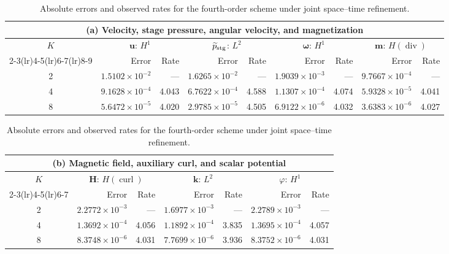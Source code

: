 \documentclass[11pt,a4paper]{article}
\newcommand{\bs}{\boldsymbol}
\DeclareMathOperator{\curl}{curl}
\DeclareMathOperator{\ddiv}{div}
\newcommand{\Div}{\ddiv}
\newcommand{\pp}{\widetilde p}
\theoremstyle{definition}
\numberwithin{equation}{section}
\begin{document}
\begin{table}[H]
\centering
\caption{Absolute errors and observed rates for the fourth-order scheme under joint space--time refinement.}
\label{tab:fourth-order-absolute-errors}
\begingroup
\small
\setlength{\tabcolsep}{3.5pt}
\renewcommand{\arraystretch}{1.10}
\begin{tabular}{@{}c*{8}{r}@{}}
\toprule
\multicolumn{9}{c}{(a) Velocity, stage pressure, angular velocity, and magnetization}\\
\midrule
$K$ & \multicolumn{2}{c}{$\bs u$: $H^1$} & \multicolumn{2}{c}{$\pp_{\rm stg}$: $L^2$} & \multicolumn{2}{c}{$\bs\omega$: $H^1$} & \multicolumn{2}{c}{$\bs m$: $H(\Div)$}\\
\cmidrule(lr){2-3}\cmidrule(lr){4-5}\cmidrule(lr){6-7}\cmidrule(lr){8-9}
 & Error & Rate & Error & Rate & Error & Rate & Error & Rate\\
\midrule
2 & $1.5102\!\times\!10^{-2}$ & --- & $1.6265\!\times\!10^{-2}$ & --- & $1.9039\!\times\!10^{-3}$ & --- & $9.7667\!\times\!10^{-4}$ & ---\\
4 & $9.1628\!\times\!10^{-4}$ & 4.043 & $6.7622\!\times\!10^{-4}$ & 4.588 & $1.1307\!\times\!10^{-4}$ & 4.074 & $5.9328\!\times\!10^{-5}$ & 4.041\\
8 & $5.6472\!\times\!10^{-5}$ & 4.020 & $2.9785\!\times\!10^{-5}$ & 4.505 & $6.9122\!\times\!10^{-6}$ & 4.032 & $3.6383\!\times\!10^{-6}$ & 4.027\\
\bottomrule
\end{tabular}
\par\medskip
\begin{tabular}{@{}c*{6}{r}@{}}
\toprule
\multicolumn{7}{c}{(b) Magnetic field, auxiliary curl, and scalar potential}\\
\midrule
$K$ & \multicolumn{2}{c}{$\bs H$: $H(\curl)$} & \multicolumn{2}{c}{$\bs k$: $L^2$} & \multicolumn{2}{c}{$\varphi$: $H^1$}\\
\cmidrule(lr){2-3}\cmidrule(lr){4-5}\cmidrule(lr){6-7}
 & Error & Rate & Error & Rate & Error & Rate\\
\midrule
2 & $2.2772\!\times\!10^{-3}$ & --- & $1.6977\!\times\!10^{-3}$ & --- & $2.2789\!\times\!10^{-3}$ & ---\\
4 & $1.3692\!\times\!10^{-4}$ & 4.056 & $1.1892\!\times\!10^{-4}$ & 3.835 & $1.3695\!\times\!10^{-4}$ & 4.057\\
8 & $8.3748\!\times\!10^{-6}$ & 4.031 & $7.7699\!\times\!10^{-6}$ & 3.936 & $8.3752\!\times\!10^{-6}$ & 4.031\\
\bottomrule
\end{tabular}
\endgroup
\end{table}
\clearpage
\end{document}
